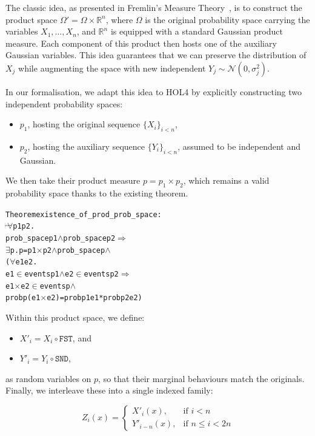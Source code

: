 The classic idea, as presented in Fremlin’s Measure Theory~\cite{fremlinmeasure}, is to construct the product space $\Omega' = \Omega \times \mathbb{R}^n$, where $\Omega$ is the original probability space carrying the variables $X_1, \dots, X_n$, and $\mathbb{R}^n$ is equipped with a standard Gaussian product measure. Each component of this product then hosts one of the auxiliary Gaussian variables. This idea guarantees that we can preserve the distribution of $X_j$ while augmenting the space with new independent $Y_j \sim \mathcal{N}(0, \sigma_j^2)$.

In our formalisation, we adapt this idea to HOL4 by explicitly constructing two independent probability spaces:
\begin{itemize}
    \item $p_1$, hosting the original sequence $\{X_i\}_{i < n}$,
    \item $p_2$, hosting the auxiliary sequence $\{Y_i\}_{i < n}$, assumed to be independent and Gaussian.
\end{itemize}

We then take their product measure $p = p_1 \times p_2$, which remains a valid probability space thanks to the existing  theorem.

\begin{hol}
  \begin{alltt}
    Theorem existence\_of\_prod\_prob\_space :
    \(\!\!\!{\turn}\!\!\!\!\) \(\forall\)p1 p2.
    prob\_space p1 \(\land\) prob\_space p2 \(\Rightarrow\)
    \(\exists\)p. p = p1 \(\times\) p2 \(\land\) prob\_space p \(\land\)
    (\(\forall\)e1 e2.
    e1 \(\in\) events p1 \(\land\) e2 \(\in\) events p2 \(\Rightarrow\)
    e1 \(\times\) e2 \(\in\) events p \(\land\)
    prob p (e1 \(\times\) e2) = prob p1 e1 * prob p2 e2)
  \end{alltt}
\end{hol}

Within this product space, we define:
\begin{itemize}
    \item $X'_i = X_i \circ \texttt{FST}$, and
    \item $Y'_i = Y_i \circ \texttt{SND}$,
\end{itemize}

as random variables on $p$, so that their marginal behaviours match the originals. Finally, we interleave these into a single indexed family:

\[
    Z_i(x) =
    \begin{cases}
      X'_i(x), & \text{if } i < n \\
      Y'_{i-n}(x), & \text{if } n \leq i < 2n
    \end{cases}
\]

